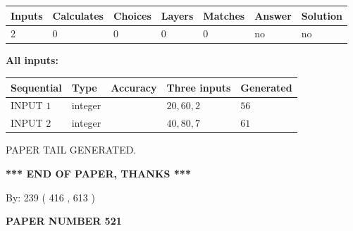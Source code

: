\documentclass[12pt]{article}
\begin{document}
   
   
   
\noindent\begin{tabular}{|l|l|l|l|l|l|l|}
 \hline
Inputs & Calculates & Choices & Layers & Matches & Answer & Solution \\ \hline
 2  & 
 0  & 
 0
  & 
 0  & 
 0  & 
  no & 
  no 
  \\ \hline
 \end{tabular}
   
   
   
   
\noindent{}
   
   
   
   
\noindent\vspace{0.1in}\hspace{-0.08in} {\textbf{\Large{All inputs: }}}
   
   
  
  
\noindent\begin{tabular}{|l|l|l|l|l|}
\hline
 Sequential & Type & Accuracy & Three inputs & Generated \\ 
\hline
 
 
  INPUT $  1 $ & integer &  & $
 20
 , 
 60
 , 
 2
 $ & $ 56 $ 
 \\  \hline  
 
 
  INPUT $  2 $ & integer &  & $
 40
 , 
 80
 , 
 7
 $ & $ 61 $ 
 \\  \hline  
 \end{tabular}
   
   
   
   
   
   
 \vspace{0.2in}
 
   
   
\vspace{2.0in} PAPER TAIL GENERATED.
   
   
   
   
\vspace{1.0in} 
{\textbf{\large{ *** END OF PAPER, THANKS *** }}} 
   
   
\hspace{1.0in} By: 
 239 ( 416 ,  613 )
   
   
   
   
\newpage 
\setcounter{page}{ 
   521001 } 
   
   
   
   
 {\textbf{ \Large{ PAPER NUMBER  521  }}}
   
\end{document}
